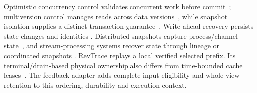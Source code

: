 Optimistic concurrency control validates concurrent work before
commit~\cite{kung1981occ}; multiversion control manages reads across data
versions~\cite{bernstein1983mvcc}, while snapshot isolation supplies a
distinct transaction guarantee~\cite{berenson1995isolation}.
Write-ahead recovery persists state changes and identities
\cite{mohan1992aries}. Distributed snapshots capture process/channel
state~\cite{chandy1985snapshots}, and stream-processing systems recover
state through lineage or coordinated snapshots
\cite{zaharia2013dstreams,carbone2017flinkstate}. RevTrace replays a local
verified selected prefix. Its terminal/drain-based physical ownership
also differs from time-bounded cache leases~\cite{gray1989leases}.
The feedback adapter adds complete-input eligibility and whole-view
retention to this ordering, durability and execution context.
